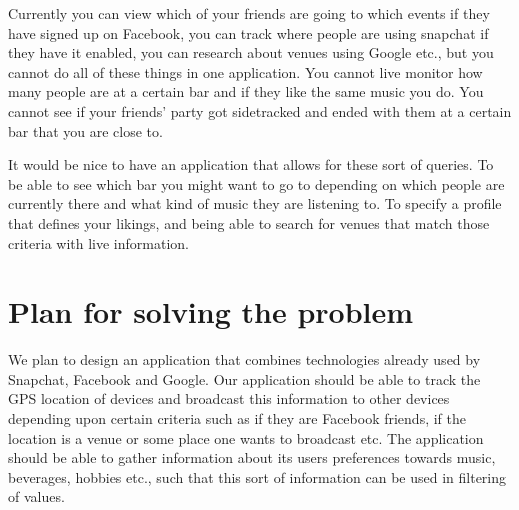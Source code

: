 \documentclass{article}
\begin{document}
Currently you can view which of your friends are going to which events if they have signed up on Facebook, you can track where people are using snapchat if they have it enabled, you can research about venues using Google etc., but you cannot do all of these things in one application. You cannot live monitor how many people are at a certain bar and if they like the same music you do. You cannot see if your friends' party got sidetracked and ended with them at a certain bar that you are close to.

\noindent It would be nice to have an application that allows for these sort of queries. To be able to see which bar you might want to go to depending on which people are currently there and what kind of music they are listening to. To specify a profile that defines your likings, and being able to search for venues that match those criteria with live information.




\section*{Plan for solving the problem}



We plan to design an application that combines technologies already used by Snapchat, Facebook and Google. Our application should be able to track the GPS location of devices and broadcast this information to other devices depending upon certain criteria such as if they are Facebook friends, if the location is a venue or some place one wants to broadcast etc. The application should be able to gather information about its users preferences towards music, beverages, hobbies etc., such that this sort of information can be used in filtering of values.
\end{document}
